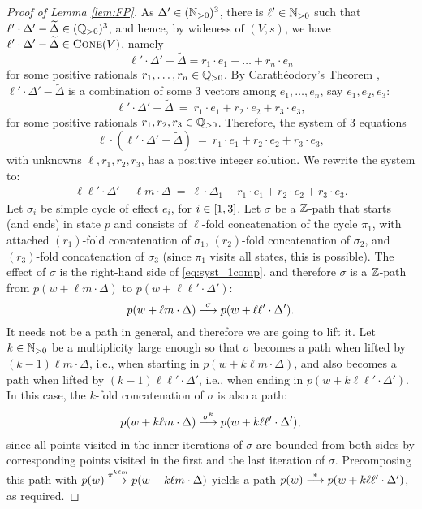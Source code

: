 \begin{proof}[Proof of Lemma \ref{lem:FP}]
As $\Delta'\in(\mathbb{N}_{>0})^3$, there is $\ell'\in\mathbb{N}_{>0}$ such that 
$\ell'\cdot\Delta'-\widetilde \Delta \in (\mathbb{Q}_{>0})^3$,
and hence, by wideness of $(V, s)$, we have
$\ell'\cdot\Delta'-\widetilde \Delta \in \textsc{Cone}(V)$, namely
\[
\ell'\cdot\Delta' - \widetilde \Delta = r_1 \cdot e_1 + \ldots + r_n \cdot e_n
\] 
for some positive rationals $r_1, \ldots, r_n\in \mathbb{Q}_{>0}$.
%
By Carathéodory's Theorem \cite[p.94]{cara}, $\ell'\cdot\Delta'-\widetilde \Delta$ is a combination of some $3$ vectors
among $e_1, \ldots, e_n$, say $e_1, e_2, e_3$:
\[
\ell'\cdot\Delta' - \widetilde \Delta \ = \ r_1 \cdot e_1 + r_2 \cdot e_2 + r_3 \cdot e_3,
\] 
for some positive rationals $r_1, r_2, r_3\in\mathbb{Q}_{>0}$.
Therefore, the system of $3$ equations
\[
\ell \cdot (\ell'\cdot\Delta'-\widetilde\Delta)  \ = \ r_1 \cdot e_1 + r_2 \cdot e_2 + r_3 \cdot e_3,
\]
with unknowns $\ell, r_1, r_2, r_3$, has a positive integer solution.
We rewrite the system to:
\begin{align} \label{eq:syst_1comp}
\ell \ell'\cdot \Delta' - \ell m \cdot \Delta \ = \  \ell\cdot\Delta_1 + r_1 \cdot e_1 + r_2 \cdot e_2 + r_3 \cdot e_3.
\end{align}
%
Let $\sigma_i$ be simple cycle of effect $e_i$, for $i\in[1, 3]$.
Let $
\sigma
$
be a $\mathbb{Z}$-path that starts (and ends) in state $p$ and consists of 
$\ell$-fold concatenation of the cycle $\pi_1$, with attached 
$(r_1)$-fold concatenation of $\sigma_1$,
$(r_2)$-fold concatenation of $\sigma_2$,
and
$(r_3)$-fold concatenation of $\sigma_3$
(since $\pi_1$ visits all states, this is possible).
The effect of $\sigma$ is the right-hand side of \eqref{eq:syst_1comp}, and therefore
$\sigma$ is a $\mathbb{Z}$-path from $p(w+\ell m \cdot \Delta)$ to
$p(w + \ell \ell'\cdot \Delta')$:
\[
p(w + \ell m \cdot \Delta) \stackrel{\sigma}{\longrightarrow} p(w+\ell \ell'\cdot \Delta').
\]
It needs not be a path in general, and therefore we are going to lift it.
Let $k\in\mathbb{N}_{>0}$ be a multiplicity large enough so that $\sigma$ becomes a path
when lifted by $(k-1)\ell m \cdot \Delta$, i.e., when starting in $p(w+k \ell m \cdot \Delta)$, 
and also becomes a path when lifted by $(k-1)\ell\ell'\cdot \Delta'$, i.e., when
ending in 
$p(w+k \ell\ell' \cdot \Delta')$.
In this case, the $k$-fold concatenation of $\sigma$ is also a path:
%
\begin{align} \label{eq:thepath}
p(w+k\ell m\cdot \Delta) \stackrel{\sigma^{k}}{\longrightarrow} 
p(w+k \ell\ell'\cdot \Delta'),
\end{align}
%
since all points visited in the inner iterations of $\sigma$ are bounded 
from both sides by corresponding points visited in the first and the last iteration of $\sigma$.
Precomposing this path with $p(w)\stackrel{\pi^{k\ell m}}{\longrightarrow} p(w + k\ell m\cdot \Delta)$ yields a path
$p(w) \stackrel{*}{\longrightarrow} p(w+ k \ell \ell'\cdot \Delta')$, as required.


\end{proof}
